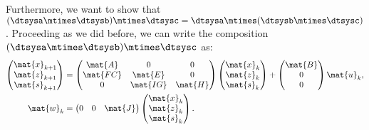 Furthermore, we want to show that~$(\dtsysa\mtimes \dtsysb)\mtimes \dtsysc=\dtsysa\mtimes (\dtsysb\mtimes \dtsysc)$.
Proceeding as we did before, we can write the composition~$(\dtsysa\mtimes \dtsysb)\mtimes \dtsysc$ as:
\begin{equation*}
    \label{eq:dlin-5}
    \begin{aligned}
        \begin{pmatrix}
            \mat{x}_{k+1} \\
            \mat{z}_{k+1} \\
            \mat{s}_{k+1}
        \end{pmatrix} & =
        \begin{pmatrix}
            \mat{A}  & 0        & 0       \\
            \mat{FC} & \mat{E}  & 0       \\
            0        & \mat{IG} & \mat{H}
        \end{pmatrix}\begin{pmatrix}
                         \mat{x}_k \\ \mat{z}_k\\ \mat{s}_k
                     \end{pmatrix}+
        \begin{pmatrix}
            \mat{B} \\ 0\\ 0
        \end{pmatrix}\mat{u}_k,                                                             \\
        \mat{w}_k                         & =\begin{pmatrix}
                                                 0 & 0 & \mat{J}
                                             \end{pmatrix}\begin{pmatrix}
                                                              \mat{x}_k \\ \mat{z}_k\\ \mat{s}_k
                                                          \end{pmatrix}.
    \end{aligned}
\end{equation*}
